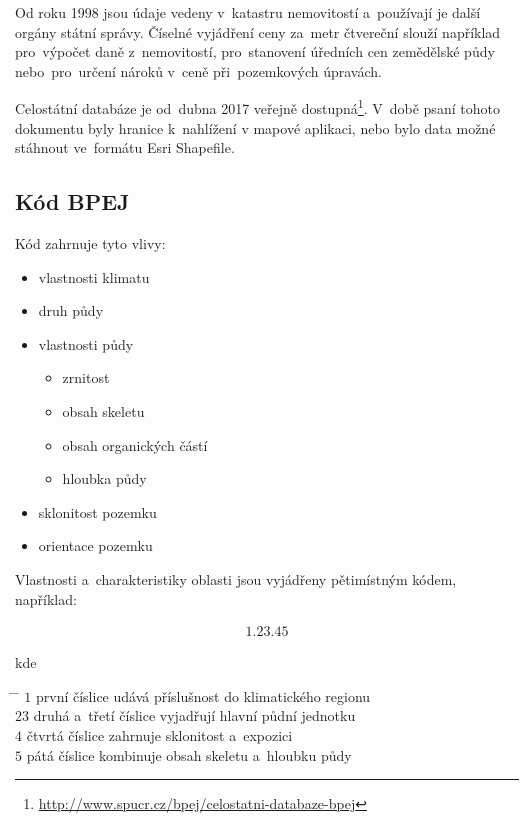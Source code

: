 Od roku 1998 jsou údaje  vedeny v~katastru nemovitostí a~používají je další orgány státní správy. Číselné vyjádření ceny  za~metr čtvereční slouží například pro~výpočet daně z~nemovitostí, pro~stanovení úředních cen zemědělské půdy nebo~pro~určení nároků v~ceně při~pozemkových úpravách.

Celostátní databáze  je od~dubna 2017 veřejně dostupná\footnote{\url{http://www.spucr.cz/bpej/celostatni-databaze-bpej}}. V~době psaní tohoto dokumentu byly hranice  k~nahlížení v mapové aplikaci, nebo bylo data možné stáhnout ve~formátu Esri Shapefile.

\subsection{Kód BPEJ}
\label{kod_bpej}

Kód  zahrnuje tyto vlivy:
	\begin{itemize}[leftmargin=1.5cm, noitemsep]
		\item vlastnosti klimatu
		\item druh půdy
		\item vlastnosti půdy
			\begin{itemize}[leftmargin=1cm, noitemsep]
				\item zrnitost
				\item obsah skeletu
				\item obsah organických částí
				\item hloubka půdy
			\end{itemize}
		\item sklonitost pozemku
		\item orientace pozemku
	\end{itemize}

Vlastnosti a~charakteristiky oblasti  jsou vyjádřeny pětimístným kódem, například:

\begin{align*}
	1.23.45
\end{align*}

kde
\begin{tabbing}
\hspace{2em} \= \hspace{5em} \= \kill
	\> $1$	\> první číslice udává příslušnost do klimatického regionu \\
	\> $23$	\> druhá a~třetí číslice vyjadřují hlavní půdní jednotku \\
	\> $4$	\> čtvrtá číslice zahrnuje sklonitost a~expozici\\
	\> $5$	\> pátá číslice kombinuje obsah skeletu a~hloubku půdy
\end{tabbing}

